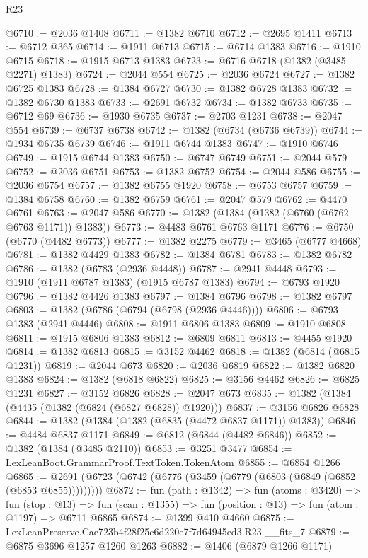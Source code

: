 \begin{lexlean}{R23}
\begin{coremodule}
@6710 := @2036 @1408
@6711 := @1382 @6710
@6712 := @2695 @1411
@6713 := @6712 @365
@6714 := @1911 @6713
@6715 := @6714 @1383
@6716 := @1910 @6715
@6718 := @1915 @6713 @1383
@6723 := @6716 @6718 (@1382 (@3485 @2271) @1383)
@6724 := @2044 @554
@6725 := @2036 @6724
@6727 := @1382 @6725 @1383
@6728 := @1384 @6727
@6730 := @1382 @6728 @1383
@6732 := @1382 @6730 @1383
@6733 := @2691 @6732
@6734 := @1382 @6733
@6735 := @6712 @69
@6736 := @1930 @6735
@6737 := @2703 @1231
@6738 := @2047 @554
@6739 := @6737 @6738
@6742 := @1382 (@6734 (@6736 @6739))
@6744 := @1934 @6735 @6739
@6746 := @1911 @6744 @1383
@6747 := @1910 @6746
@6749 := @1915 @6744 @1383
@6750 := @6747 @6749
@6751 := @2044 @579
@6752 := @2036 @6751
@6753 := @1382 @6752
@6754 := @2044 @586
@6755 := @2036 @6754
@6757 := @1382 @6755 @1920
@6758 := @6753 @6757
@6759 := @1384 @6758
@6760 := @1382 @6759
@6761 := @2047 @579
@6762 := @4470 @6761
@6763 := @2047 @586
@6770 := @1382 (@1384 (@1382 (@6760 (@6762 @6763 @1171)) @1383))
@6773 := @4483 @6761 @6763 @1171
@6776 := @6750 (@6770 (@4482 @6773))
@6777 := @1382 @2275
@6779 := @3465 (@6777 @4668)
@6781 := @1382 @4429 @1383
@6782 := @1384 @6781
@6783 := @1382 @6782
@6786 := @1382 (@6783 (@2936 @4448))
@6787 := @2941 @4448
@6793 := @1910 (@1911 @6787 @1383) (@1915 @6787 @1383)
@6794 := @6793 @1920
@6796 := @1382 @4426 @1383
@6797 := @1384 @6796
@6798 := @1382 @6797
@6803 := @1382 (@6786 (@6794 (@6798 (@2936 @4446))))
@6806 := @6793 @1383 (@2941 @4446)
@6808 := @1911 @6806 @1383
@6809 := @1910 @6808
@6811 := @1915 @6806 @1383
@6812 := @6809 @6811
@6813 := @4455 @1920
@6814 := @1382 @6813
@6815 := @3152 @4462
@6818 := @1382 (@6814 (@6815 @1231))
@6819 := @2044 @673
@6820 := @2036 @6819
@6822 := @1382 @6820 @1383
@6824 := @1382 (@6818 @6822)
@6825 := @3156 @4462
@6826 := @6825 @1231
@6827 := @3152 @6826
@6828 := @2047 @673
@6835 := @1382 (@1384 (@4435 (@1382 (@6824 (@6827 @6828)) @1920)))
@6837 := @3156 @6826 @6828
@6844 := @1382 (@1384 (@1382 (@6835 (@4472 @6837 @1171)) @1383))
@6846 := @4484 @6837 @1171
@6849 := @6812 (@6844 (@4482 @6846))
@6852 := @1382 (@1384 (@3485 @2110))
@6853 := @3251 @3477
@6854 := LexLeanBoot.GrammarProof.TextToken.TokenAtom
@6855 := @6854 @1266
@6865 := @2691 (@6723 (@6742 (@6776 (@3459 (@6779 (@6803 (@6849 (@6852 (@6853 @6855)))))))))
@6872 := fun (path : @1342) =>
  fun (atoms : @3420) =>
  fun (stop : @13) =>
  fun (scan : @1355) => fun (position : @13) => fun (atom : @1197) => @6711 @6865
@6874 := @1399 @410 @4660
@6875 := LexLeanPreserve.Cae723b4f28f25c6d220e7f7d64945ed3.R23.__fits_7
@6879 := @6875 @3696 @1257 @1260 @1263
@6882 := @1406 (@6879 @1266 @1171)

\end{coremodule}
\end{lexlean}

